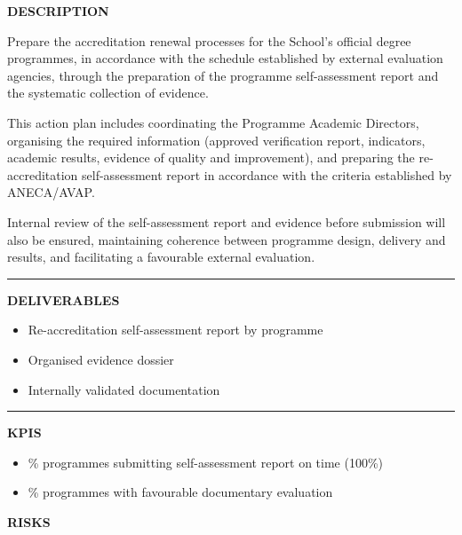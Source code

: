 \documentclass[11pt,a4paper]{scrreprt}
\newcommand{\fieldlabel}[1]{%
  {\footnotesize\sffamily\bfseries\color{mutedcolor}\MakeUppercase{#1}}\par\nopagebreak[4]
}
\newcommand{\fieldsep}{\vspace{3pt}\noindent\textcolor{bordercolor}{\rule{\linewidth}{0.4pt}}\vspace{3pt}\par}
\begin{document}
\begin{tcolorbox}[pabox={aacolor}{A.P.3.1 \enspace\textbullet\enspace Preparation of Accreditation Renewal Processes}]

\fieldlabel{Description}
{\small Prepare the accreditation renewal processes for the School's official degree programmes, in accordance with the schedule established by external evaluation agencies, through the preparation of the programme self-assessment report and the systematic collection of evidence. 

This action plan includes coordinating the Programme Academic Directors, organising the required information (approved verification report, indicators, academic results, evidence of quality and improvement), and preparing the re-accreditation self-assessment report in accordance with the criteria established by ANECA/AVAP. 

Internal review of the self-assessment report and evidence before submission will also be ensured, maintaining coherence between programme design, delivery and results, and facilitating a favourable external evaluation. }\par
\fieldsep
\fieldlabel{Deliverables}
{\small \begin{itemize}[noitemsep,topsep=2pt]
\item Re-accreditation self-assessment report by programme
\item Organised evidence dossier
\item Internally validated documentation
\end{itemize}}\par
\fieldsep
\fieldlabel{KPIs}
{\small \begin{itemize}[noitemsep,topsep=2pt]
\item \% programmes submitting self-assessment report on time (100\%)
\item \% programmes with favourable documentary evaluation
\end{itemize}}\par
\end{tcolorbox}
\begin{tcolorbox}[riskbox]
{\footnotesize\sffamily\bfseries\color{red!50!black} RISKS}\par{}
\end{tcolorbox}
\end{document}
